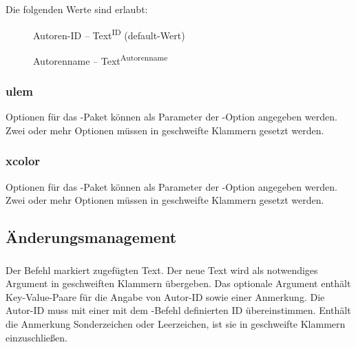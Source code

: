 Die folgenden Werte sind erlaubt:
\begin{description}
	\item [] Autoren-ID -- Text\textsuperscript{ID} (default-Wert)
	\item [] Autorenname -- Text\textsuperscript{Autorenname}
\end{description}




\subsubsection{ulem}

Optionen für das -Paket können als Parameter der -Option angegeben werden.
Zwei oder mehr Optionen müssen in geschweifte Klammern gesetzt werden.




\subsubsection{xcolor}

Optionen für das -Paket können als Parameter der -Option angegeben werden.
Zwei oder mehr Optionen müssen in geschweifte Klammern gesetzt werden.





\subsection{Änderungsmanagement}
\label{sec:user:changemanagement}

\subsubsection{}
\DescribeMacro{\added}

Der Befehl  markiert zugefügten Text.
Der neue Text wird als notwendiges Argument in geschweiften Klammern übergeben.
Das optionale Argument enthält Key-Value-Paare für die Angabe von Autor-ID sowie einer Anmerkung.
Die Autor-ID muss mit einer mit dem -Befehl definierten ID übereinstimmen.
Enthält die Anmerkung Sonderzeichen oder Leerzeichen, ist sie in geschweifte Klammern einzuschließen.


